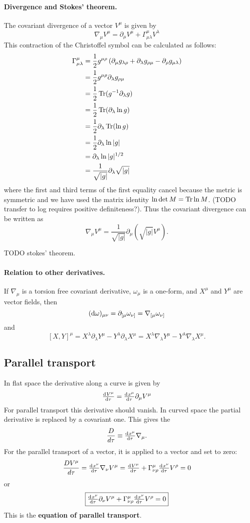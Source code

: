 \paragraph{Divergence and Stokes' theorem.} The covariant divergence of a vector $V^\mu$ is given by
\[ \nabla_\mu V^\mu = \partial_\mu V^\mu + \Gamma^\mu_{\mu\lambda}V^\lambda \]
This contraction of the Christoffel symbol can be calculated as follows:
\begin{align}
\Gamma^\mu_{\mu\lambda} &= \frac{1}{2}g^{\mu\rho}\left(\partial_\mu g_{\lambda\rho} + \partial_\lambda g_{\rho\mu}-\partial_\rho g_{\mu\lambda}\right) \\
&= \frac{1}{2}g^{\mu\rho}\partial_\lambda g_{\rho\mu} \\
&= \frac{1}{2}\operatorname{Tr}(g^{-1}\partial_\lambda g) \\
&= \frac{1}{2}\operatorname{Tr}(\partial_\lambda \ln g) \\
&= \frac{1}{2} \partial_\lambda \operatorname{Tr}(\ln g) \\
&= \frac{1}{2} \partial_\lambda \ln |g| \\
&= \partial_\lambda \ln |g|^{1/2} \\
&= \frac{1}{\sqrt{|g|}}\partial_\lambda \sqrt{|g|}
\end{align}
where the first and third terms of the first equality cancel because the metric is symmetric and we have used the matrix identity $\ln\det M=\operatorname{Tr}\ln M$. (TODO transfer to log requires positive definiteness?). Thus the covariant divergence can be written as
\[ \nabla_\mu V^\mu = \frac{1}{\sqrt{|g|}}\partial_\mu \left(\sqrt{|g|}V^\mu\right). \]

TODO stokes' theorem.

\paragraph{Relation to other derivatives.}
If $\nabla_\mu$ is a torsion free covariant derivative, $\omega_\mu$ is a one-form, and $X^\mu$ and $Y^\mu$ are vector fields, then
\[ (\operatorname{d \!}{\omega})_{\mu\nu} = \partial_{[\mu}\omega_{\nu]} = \nabla_{[\mu}\omega_{\nu]} \]
and
\[ [X, Y]^\mu = X^\lambda\partial_\lambda Y^\mu - Y^\lambda\partial_\lambda X^\mu = X^\lambda\nabla_\lambda Y^\mu - Y^\lambda\nabla_\lambda X^\mu. \]


\subsection{Parallel transport}
In flat space the derivative along a curve is given by
\[\od{V^\mu}{\tau} = \od{x^\mu}{\tau} \partial_\mu V^\mu\]
For parallel transport this derivative should vanish. In curved space the partial derivative is replaced by a covariant one. This gives the 
\[ \frac{D}{d\tau} \equiv \od{x^\mu}{\tau}\nabla_\mu. \]
For the parallel transport of a vector, it is applied to a vector and set to zero:
\[ \frac{DV^\mu}{d\tau} = \od{x^\nu}{\tau} \nabla_\nu V^\mu = \od{V^\mu}{\tau} + \Gamma^\mu_{\nu\rho} \od{x^\nu}{\tau} V^\rho = 0 \]
or
\[ \boxed{ \od{x^\nu}{\tau}\partial_\nu V^\mu + \Gamma^\mu_{\nu\rho} \od{x^\nu}{\tau} V^\rho = 0 } \]
This is the \textbf{equation of parallel transport}.

